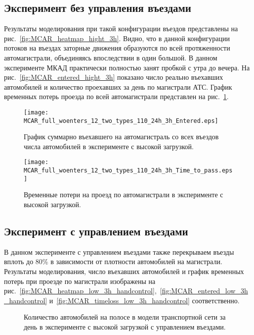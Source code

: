 \subsection{Эксперимент без управления въездами}
Результаты моделирования при такой конфигурации въездов представлены на рис.~\ref{fig:MCAR_heatmap_hight_3h}.
Видно, что в данной конфигурации потоков на въездах заторные движения образуются по всей протяженности автомагистрали, объединяясь впоследствии в один большой. В данном эксперименте МКАД практически полностью занят пробкой с утра до вечера.
На рис.~\ref{fig:MCAR_entered_hight_3h} показано число реально въехавших автомобилей и количество проехавших за день по магистрали АТС.
График временных потерь проезда по всей автомагистрали представлен на рис.~\ref{fig:MCAR_timeloss_hight_3h}.

\begin{figure}[ht]
    \begin{minipage}[b][][b]{0.49\textwidth}
        \centering
        \texttt{[image: MCAR\_full\_woenters\_12\_two\_types\_110\_24h\_3h\_Entered.eps]}
        \caption{График суммарно въехавшего на автомагистраль со всех въездов числа автомобилей в эксперименте с высокой загрузкой.}
        \label{fig:MCAR_entered_hight_3h}
    \end{minipage}
    \hfill
    \begin{minipage}[b][][b]{0.49\textwidth}
        \centering
        \texttt{[image: MCAR\_full\_woenters\_12\_two\_types\_110\_24h\_3h\_Time\_to\_pass.eps]}
        \caption{Временные потери на проезд по автомагистрали в эксперименте с высокой загрузкой.}
        \label{fig:MCAR_timeloss_hight_3h}
    \end{minipage}
\end{figure}


\subsection{Эксперимент с управлением въездами}
В данном эксперименте с управлением въездами также перекрываем въезды вплоть до 80\% в зависимости от плотности автомобилей на магистрали.
Результаты моделирования, число въехавших автомобилей и график временных потерь при проезде по магистрали изображены на рис.~\ref{fig:MCAR_heatmap_low_3h_handcontrol},~\ref{fig:MCAR_entered_low_3h_handcontrol} и~\ref{fig:MCAR_timeloss_low_3h_handcontrol} соответственно.
\begin{figure}[ht]
    \caption{Количество автомобилей на полосе в модели транспортной сети за день в эксперименте с высокой загрузкой с управлением въездами.}
    \label{fig:MCAR_heatmap_hight_3h_handcontrol}
\end{figure}

